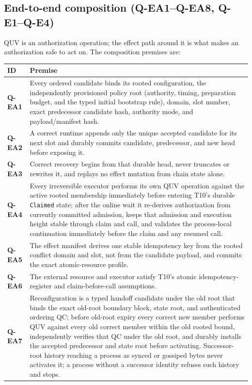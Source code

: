 \documentclass[11pt]{article}
\newcommand{\code}[1]{\texttt{#1}}
\begin{document}
\subsection{End-to-end composition (Q-EA1--Q-EA8, Q-E1--Q-E4)}
\label{sec:quv-end-to-end}

QUV is an authorization operation; the effect path around it is what makes an
authorization safe to act on. The composition premises are:

\begin{center}
\small
\begin{tabularx}{\textwidth}{>{\raggedright\arraybackslash}p{} X}
\toprule
\textbf{ID} & \textbf{Premise} \\
\midrule
\textbf{Q-EA1} & Every ordered candidate binds its rooted configuration, the independently provisioned policy root (authority, timing, preparation budget, and the typed initial bootstrap rule), domain, slot number, exact predecessor candidate hash, authority mode, and payload/manifest hash. \\
\textbf{Q-EA2} & A correct runtime appends only the unique accepted candidate for its next slot and durably commits candidate, predecessor, and new head before exposing it. \\
\textbf{Q-EA3} & Correct recovery begins from that durable head, never truncates or rewrites it, and replays no effect mutation from chain state alone. \\
\textbf{Q-EA4} & Every irreversible executor performs its own QUV operation against the active rooted membership immediately before entering T10's durable \code{Claimed} state; after the online wait it re-derives authorization from currently committed admission, keeps that admission and execution height stable through claim and call, and validates the process-local continuation immediately before the claim and any resumed call. \\
\textbf{Q-EA5} & The effect manifest derives one stable idempotency key from the rooted conflict domain and slot, not from the candidate payload, and commits the exact atomic-resource profile. \\
\textbf{Q-EA6} & The external resource and executor satisfy T10's atomic idempotency-register and claim-before-call assumptions. \\
\textbf{Q-EA7} & Reconfiguration is a typed handoff candidate under the old root that binds the exact old-root boundary block, state root, and authenticated ordering QC; before old-root expiry every correct new member performs QUV against every old correct member within the old rooted bound, independently verifies that QC under the old root, and durably installs the accepted predecessor and state root before activating. Successor-root history reaching a process as synced or gossiped bytes never activates it; a process without a successor identity refuses such history and stops. \\

\end{tabularx}
\end{center}
\end{document}
